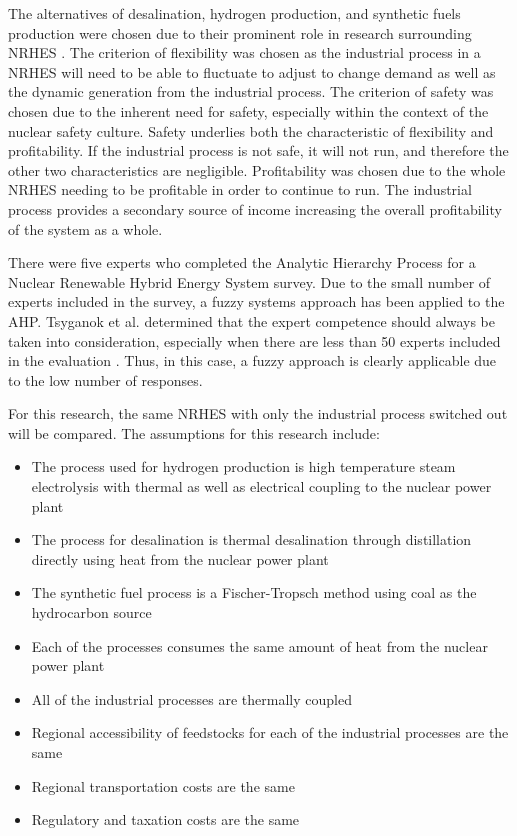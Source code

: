 	The alternatives of desalination, hydrogen production, and synthetic fuels production were chosen due to their prominent role in research surrounding NRHES \cite{Bragg-Sitton2014,Locatelli2015,Kim2016,Bragg-Sitton2016,Garcia2016,Shropshire2011, Ruth2014,Bienvenu2015}.  The criterion of flexibility was chosen as the industrial process in a NRHES will need to be able to fluctuate to adjust to change demand as well as the dynamic generation from the industrial process.  The criterion of safety was chosen due to the inherent need for safety, especially within the context of the nuclear safety culture.  Safety underlies both the characteristic of flexibility and profitability. If the industrial process is not safe, it will not run, and therefore the other two characteristics are negligible. Profitability was chosen due to the whole NRHES needing to be profitable in order to continue to run.  The industrial process provides a secondary source of income  increasing the overall profitability of the system as a whole.

There were five experts who completed the Analytic Hierarchy Process for a Nuclear Renewable Hybrid Energy System survey. Due to the small number of experts included in the survey, a fuzzy systems approach has been applied to the AHP. Tsyganok et al. determined that the expert competence should always be taken into consideration, especially when there are less than 50 experts included in the evaluation \cite{Tsyganok2012}. Thus, in this case, a fuzzy approach is clearly applicable due to the low number of responses.

 For this research, the same NRHES with only the industrial process switched out will be compared. The assumptions for this research include:
\begin{itemize}
\item The process used for hydrogen production is high temperature steam electrolysis with thermal as well as electrical coupling to the nuclear power plant
\item  The process for desalination is thermal desalination through distillation directly using heat from the nuclear power plant
\item The synthetic fuel process is a Fischer-Tropsch method using coal as the hydrocarbon source
\item Each of the processes consumes the same amount of heat from the nuclear power plant
\item All of the industrial processes are thermally coupled
\item Regional accessibility of feedstocks for each of the industrial processes are the same
\item Regional transportation costs are the same
\item Regulatory and taxation costs are the same
\end{itemize}

